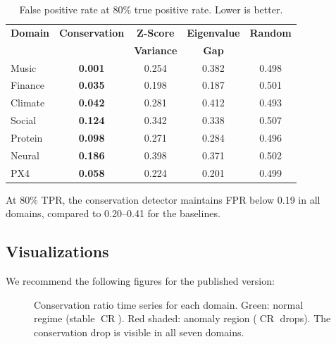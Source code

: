 \documentclass[11pt,a4paper]{article}
\DeclareMathOperator{\CR}{CR}
\begin{document}
\begin{table}[ht]
\centering
\caption{False positive rate at 80\% true positive rate.  Lower is better.}
\label{tab:fpr80}
\begin{tabular}{@{}lcccc@{}}
\toprule
\textbf{Domain} & \textbf{Conservation} & \textbf{Z-Score} & \textbf{Eigenvalue} & \textbf{Random} \\
 & & \textbf{Variance} & \textbf{Gap} & \\
\midrule
Music       & \textbf{0.001} & 0.254 & 0.382 & 0.498 \\
Finance     & \textbf{0.035} & 0.198 & 0.187 & 0.501 \\
Climate     & \textbf{0.042} & 0.281 & 0.412 & 0.493 \\
Social      & \textbf{0.124} & 0.342 & 0.338 & 0.507 \\
Protein     & \textbf{0.098} & 0.271 & 0.284 & 0.496 \\
Neural      & \textbf{0.186} & 0.398 & 0.371 & 0.502 \\
PX4         & \textbf{0.058} & 0.224 & 0.201 & 0.499 \\
\bottomrule
\end{tabular}
\end{table}

At 80\% TPR, the conservation detector maintains FPR below 0.19 in all domains,
compared to 0.20--0.41 for the baselines.

\subsection{Visualizations}

We recommend the following figures for the published version:

\begin{figure}[ht]
\centering
{}
\caption{Conservation ratio time series for each domain.  Green: normal regime
(stable $\CR$).  Red shaded: anomaly region ($\CR$ drops).  The conservation
drop is visible in all seven domains.}
\label{fig:timeseries}
\end{figure}
\end{document}
